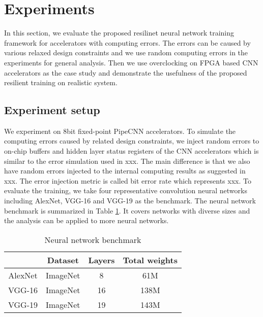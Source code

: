 \section{Experiments} \label{sec:casestudy}
In this section, we evaluate the proposed resilinet neural network training 
framework for accelerators with computing errors. The errors can be caused by 
various relaxed design constraints and we use random computing errors in 
the experiments for general analysis. Then we use overclocking on FPGA based 
CNN accelerators as the case study and demonstrate the usefulness of the 
proposed resilient training on realistic system.

\subsection{Experiment setup}
We experiment on 8bit fixed-point PipeCNN \cite{pipecnn_2} accelerators. 
To simulate the computing errors caused by related design constraints, we 
inject random errors to on-chip buffers and hidden layer status registers of 
the CNN accelerators which is similar to the error simulation used in xxx. 
The main difference is that we also have random errors injected to the 
internal computing results as suggested in xxx. The error injection metric 
is called bit error rate which represents xxx. To evaluate the training, 
we take four representative convolution neural networks including 
AlexNet, VGG-16 and VGG-19 as the benchmark. The neural network 
benchmark is summarized in Table \ref{tab:CNN-table}. It covers networks with 
diverse sizes and the analysis can be applied to more neural networks.
\begin{table}[h]
        \centering
        \vspace{-0.3em}
        \caption{Neural network benchmark}
        \label{tab:CNN-table}
        \vspace{-0.3em}
        \begin{tabular}{c|c|c|c}
		\toprule
		  & Dataset & Layers & Total weights \\
		\midrule
		AlexNet & ImageNet & 8 & 61M \\
		\midrule
		VGG-16 & ImageNet & 16 & 138M \\
		\midrule
		VGG-19 & ImageNet & 19 & 143M \\
		\bottomrule
        \end{tabular}
        \vspace{-1em}
\end{table}

